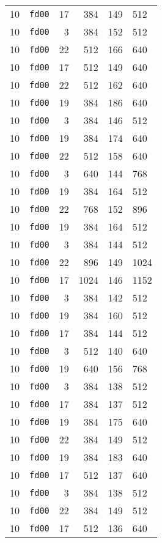 \documentclass{article}
\begin{document}
\begin{table}[h!]
\begin{tabular}{llrrrl}
    10 & \texttt{fd00} & 17 & 384 & 149 & 512 \\
    10 & \texttt{fd00} & 3 & 384 & 152 & 512 \\
    10 & \texttt{fd00} & 22 & 512 & 166 & 640 \\
    10 & \texttt{fd00} & 17 & 512 & 149 & 640 \\
    10 & \texttt{fd00} & 22 & 512 & 162 & 640 \\
    10 & \texttt{fd00} & 19 & 384 & 186 & 640 \\
    10 & \texttt{fd00} & 3 & 384 & 146 & 512 \\
    10 & \texttt{fd00} & 19 & 384 & 174 & 640 \\
    10 & \texttt{fd00} & 22 & 512 & 158 & 640 \\
    10 & \texttt{fd00} & 3 & 640 & 144 & 768 \\
    10 & \texttt{fd00} & 19 & 384 & 164 & 512 \\
    10 & \texttt{fd00} & 22 & 768 & 152 & 896 \\
    10 & \texttt{fd00} & 19 & 384 & 164 & 512 \\
    10 & \texttt{fd00} & 3 & 384 & 144 & 512 \\
    10 & \texttt{fd00} & 22 & 896 & 149 & 1024 \\
    10 & \texttt{fd00} & 17 & 1024 & 146 & 1152 \\
    10 & \texttt{fd00} & 3 & 384 & 142 & 512 \\
    10 & \texttt{fd00} & 19 & 384 & 160 & 512 \\
    10 & \texttt{fd00} & 17 & 384 & 144 & 512 \\
    10 & \texttt{fd00} & 3 & 512 & 140 & 640 \\
    10 & \texttt{fd00} & 19 & 640 & 156 & 768 \\
    10 & \texttt{fd00} & 3 & 384 & 138 & 512 \\
    10 & \texttt{fd00} & 17 & 384 & 137 & 512 \\
    10 & \texttt{fd00} & 19 & 384 & 175 & 640 \\
    10 & \texttt{fd00} & 22 & 384 & 149 & 512 \\
    10 & \texttt{fd00} & 19 & 384 & 183 & 640 \\
    10 & \texttt{fd00} & 17 & 512 & 137 & 640 \\
    10 & \texttt{fd00} & 3 & 384 & 138 & 512 \\
    10 & \texttt{fd00} & 22 & 384 & 149 & 512 \\
    10 & \texttt{fd00} & 17 & 512 & 136 & 640 \\

\end{tabular}
\end{table}
\end{document}
